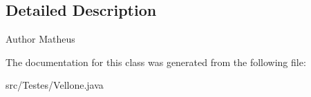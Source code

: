 \subsection{Detailed Description}
\begin{DoxyAuthor}{Author}
Matheus 
\end{DoxyAuthor}


The documentation for this class was generated from the following file\+:\begin{DoxyCompactItemize}
\item 
src/\+Testes/Vellone.\+java\end{DoxyCompactItemize}
